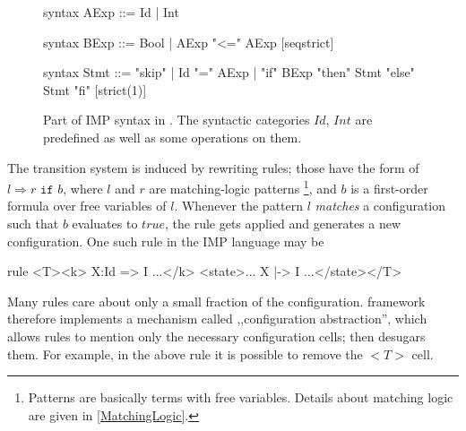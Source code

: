 \documentclass{fithesis3}
\newcommand{\var}[1]{\mathit{#1}}
\begin{document}
\begin{figure}
\caption{Part of IMP syntax in \K. The syntactic categories $\var{Id}$, $\var{Int}$ are predefined as well as some operations on them. }
\label{ImpSyntaxInK}
\begin{asciik}
syntax AExp ::= Id | Int

syntax BExp  ::= Bool
| AExp "<=" AExp [seqstrict]

syntax Stmt  ::= "skip"
| Id "=" AExp
| "if" BExp "then" Stmt "else" Stmt "fi" [strict(1)]
\end{asciik}
\end{figure}






The transition system is induced by rewriting rules; those have the form of $l \Rightarrow r \texttt{ if } b$, where $l$ and $r$ are matching-logic patterns \footnote{Patterns are basically terms with free variables. Details about matching logic are given in \ref{MatchingLogic}.},
and $b$ is a first-order formula over free variables of $l$. Whenever the pattern $l$ \textit{matches} a configuration such that $b$ evaluates to $\var{true}$, the rule gets applied and generates a new configuration. One such rule in the IMP language may be
\begin{asciik}[basicstyle=\small]
rule <T><k> X:Id => I ...</k>
     <state>... X |-> I ...</state></T>
\end{asciik}




Many rules care about only a small fraction of the configuration. \K framework therefore implements a mechanism called ,,configuration abstraction'', which allows rules to mention only the necessary configuration cells; \K then desugars them. For example, in the above rule it is possible to remove the $<T>$ cell.
\end{document}
